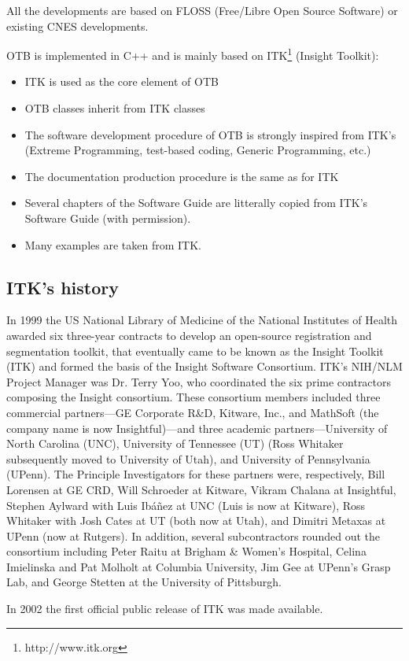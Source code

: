 All the developments are based on FLOSS (Free/Libre Open Source
Software) or existing CNES developments.

OTB is implemented in C++ and is mainly based on
ITK\footnote{http://www.itk.org} (Insight Toolkit):
\begin{itemize}
  \item ITK is used as the core element of OTB
  \item OTB classes inherit from ITK classes
  \item The software development procedure of OTB is strongly inspired
  from ITK's (Extreme Programming, test-based coding, Generic
  Programming, etc.)
  \item The documentation production procedure is the same as for ITK
  \item Several chapters of the Software Guide are litterally copied
  from ITK's Software Guide (with permission).
  \item Many examples are taken from ITK.
\end{itemize}

\subsection{ITK's history}

In 1999 the US National Library of Medicine of the National Institutes of
Health awarded six three-year contracts to develop an open-source
registration and segmentation toolkit, that eventually came to be known as
the Insight Toolkit (ITK) and formed the basis of the Insight Software
Consortium. ITK's NIH/NLM Project Manager was Dr. Terry Yoo, who coordinated the
six prime contractors composing the Insight consortium. These consortium
members included three commercial partners---GE Corporate R\&D, Kitware,
Inc., and MathSoft (the company name is now Insightful)---and three academic
partners---University of North Carolina (UNC), University of Tennessee (UT)
(Ross Whitaker subsequently moved to University of Utah), and University of
Pennsylvania (UPenn). The Principle Investigators for these partners were,
respectively, Bill Lorensen at GE CRD, Will Schroeder at Kitware, Vikram
Chalana at Insightful, Stephen Aylward with Luis Ib\'a\~nez at UNC (Luis is now
at Kitware), Ross Whitaker with Josh Cates at UT (both now at Utah), and
Dimitri Metaxas at UPenn (now at Rutgers). In addition, several
subcontractors rounded out the consortium including Peter Raitu at Brigham \&
Women's Hospital, Celina Imielinska and Pat Molholt at Columbia University,
Jim Gee at UPenn's Grasp Lab, and George Stetten at the University of
Pittsburgh.

In 2002 the first official public release of ITK was made
available.




